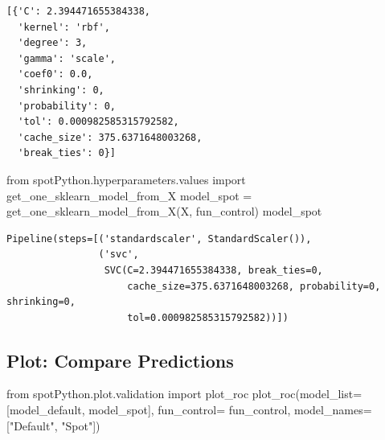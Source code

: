 \documentclass[
  letterpaper,
  DIV=11,
  numbers=noendperiod]{scrreprt}
\newenvironment{Shaded}{\begin{snugshade}}{\end{snugshade}}
\newcommand{\ImportTok}[1]{\textcolor[rgb]{0.00,0.46,0.62}{#1}}
\newcommand{\NormalTok}[1]{\textcolor[rgb]{0.00,0.23,0.31}{#1}}
\newcommand{\OperatorTok}[1]{\textcolor[rgb]{0.37,0.37,0.37}{#1}}
\newcommand{\StringTok}[1]{\textcolor[rgb]{0.13,0.47,0.30}{#1}}
\begin{document}
\begin{verbatim}
[{'C': 2.394471655384338,
  'kernel': 'rbf',
  'degree': 3,
  'gamma': 'scale',
  'coef0': 0.0,
  'shrinking': 0,
  'probability': 0,
  'tol': 0.000982585315792582,
  'cache_size': 375.6371648003268,
  'break_ties': 0}]
\end{verbatim}

\begin{Shaded}
\begin{Highlighting}[]
\ImportTok{from}\NormalTok{ spotPython.hyperparameters.values }\ImportTok{import}\NormalTok{ get\_one\_sklearn\_model\_from\_X}
\NormalTok{model\_spot }\OperatorTok{=}\NormalTok{ get\_one\_sklearn\_model\_from\_X(X, fun\_control)}
\NormalTok{model\_spot}
\end{Highlighting}
\end{Shaded}

\begin{verbatim}
Pipeline(steps=[('standardscaler', StandardScaler()),
                ('svc',
                 SVC(C=2.394471655384338, break_ties=0,
                     cache_size=375.6371648003268, probability=0, shrinking=0,
                     tol=0.000982585315792582))])
\end{verbatim}

\hypertarget{plot-compare-predictions}{%
\subsection{Plot: Compare Predictions}\label{plot-compare-predictions}}

\begin{Shaded}
\begin{Highlighting}[]
\ImportTok{from}\NormalTok{ spotPython.plot.validation }\ImportTok{import}\NormalTok{ plot\_roc}
\NormalTok{plot\_roc(model\_list}\OperatorTok{=}\NormalTok{[model\_default, model\_spot], fun\_control}\OperatorTok{=}\NormalTok{ fun\_control, model\_names}\OperatorTok{=}\NormalTok{[}\StringTok{"Default"}\NormalTok{, }\StringTok{"Spot"}\NormalTok{])}
\end{Highlighting}
\end{Shaded}
\end{document}
